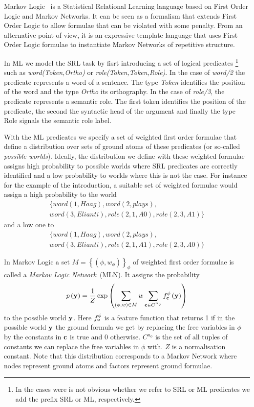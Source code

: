 Markov Logic~\citep[ML,][]{richardson05markov} is a Statistical Relational 
Learning language based on First Order Logic and Markov Networks. It can be seen 
as a formalism that extends First Order Logic to allow formulae that can be 
violated with some penalty. From an alternative point of view, it is an 
expressive template language that uses First Order Logic formulae to instantiate
Markov Networks of repetitive structure. 

In ML we model the SRL task by fisrt introducing a set of logical predicates  
\footnote{In the cases were is not obvious whether we refer to SRL or ML 
predicates we add the prefix SRL or ML, respectively.} such as 
\emph{word(Token,Ortho)} or \emph{role(Token,Token,Role)}. In the case of 
\emph{word/2} the predicate represents a word of a sentence. The type 
\emph{Token} identifies the position of the word and the type \emph{Ortho} its 
orthography. In the case of \emph{role/3}, the predicate represents a semantic 
role. The first token identifies the position of the predicate, the second the 
syntactic head of the argument and finally the type Role signals the semantic 
role label.

With the ML predicates we specify a set of weighted first order formulae that 
define a distribution over sets of ground atoms of these predicates (or 
so-called \emph{possible worlds}). Ideally, the distribution we define with 
these weighted formulae assigns high probability to possible worlds where SRL 
predicates are correctly identified and a low probability to worlds where this 
is not the case. For instance for the example of the introduction, a suitable 
set of weighted formulae would assign a high probability to the world
\begin{eqnarray*}
 &\{ word\left(1,Haag\right),word(2,plays),\\
 & word(3,Elianti),role(2,1,A0),role(2,3,A1) \}& \end{eqnarray*}
and a low one to
\begin{eqnarray*}
& \{ word\left(1,Haag\right),word(2,plays),\\
 & word(3,Elianti),role(2,1,A1),role(2,3,A0)\} &\end{eqnarray*}

In Markov Logic a set $M=\left\{ \left(\phi,w_{\phi}\right)\right\} _{\phi}$ of 
weighted first order formulae is called a \emph{Markov Logic Network}~(MLN). It 
assigns the probability
\begin{equation}
p\left(\mathbf{y}\right)=\frac{1}{Z}\exp\left(
\sum_{\left(\phi,w\right)\in M} w
\sum_{\mathbf{c}\in C^{n_{\phi}}}f_{\mathbf{c}}^{\phi}\left(\mathbf{y}\right)
\right)
\label{eq:prob}
\end{equation}
to the possible world $\mathbf{y}$. Here $f_{\mathbf{c}}^{\phi}$ is a feature
function that returns 1 if in the possible world $\mathbf{y}$ the ground
formula we get by replacing the free variables in $\phi$ by the constants
in $\mathbf{c}$ is true and 0 otherwise. $C^{n_{\phi}}$ is the set
of all tuples of constants we can replace the free variables in $\phi$
with. $Z$ is a normalisation constant. Note that this distribution corresponds 
to a Markov Network where nodes represent ground atoms and factors represent 
ground formulae. 

